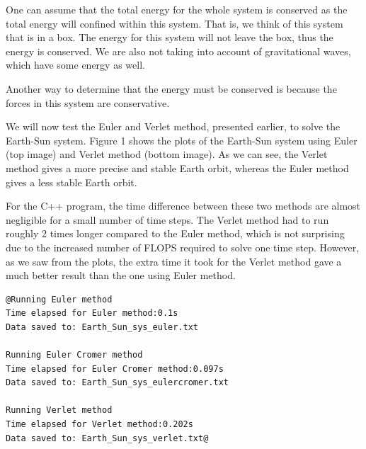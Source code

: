 \documentclass[12pt]{article}
\begin{document}
One can assume that the total energy for the whole system is conserved as the total energy will confined within this system. That is, we think of this system that is in a box. The energy for this system will not leave the box, thus the energy is conserved. We are also not taking into account of gravitational waves, which have some energy as well.

Another way to determine that the energy must be conserved is because the forces in this system are conservative.

We will now test the Euler and Verlet method, presented earlier, to solve the Earth-Sun system. Figure 1 shows the plots of the Earth-Sun system using Euler (top image) and Verlet method (bottom image). As we can see, the Verlet method gives a more precise and stable Earth orbit, whereas the Euler method gives a less stable Earth orbit.

For the C++ program, the time difference between these two methods are almost negligible for a small number of time steps. The Verlet method had to run roughly 2 times longer compared to the Euler method, which is not surprising due to the increased number of FLOPS required to solve one time step. However, as we saw from the plots, the extra time it took for the Verlet method gave a much better result than the one using Euler method.

\begin{lstlisting}
@Running Euler method
Time elapsed for Euler method:0.1s
Data saved to: Earth_Sun_sys_euler.txt

Running Euler Cromer method
Time elapsed for Euler Cromer method:0.097s
Data saved to: Earth_Sun_sys_eulercromer.txt

Running Verlet method
Time elapsed for Verlet method:0.202s
Data saved to: Earth_Sun_sys_verlet.txt@
\end{lstlisting}
\end{document}
